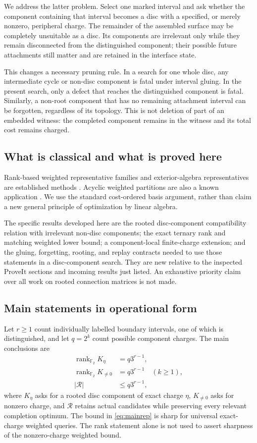\documentclass[11pt,letterpaper]{article}
\theoremstyle{definition}
\newcommand{\F}{\mathbb F}
\newcommand{\rank}{\operatorname{rank}}
\begin{document}
We address the latter problem. Select one marked interval and ask whether the component containing that interval becomes a disc with a specified, or merely nonzero, peripheral charge. The remainder of the assembled surface may be completely unsuitable as a disc. Its components are irrelevant only while they remain disconnected from the distinguished component; their possible future attachments still matter and are retained in the interface state.

This changes a necessary pruning rule. In a search for one whole disc, any intermediate cycle or non-disc component is fatal under interval gluing. In the present search, only a defect that reaches the distinguished component is fatal. Similarly, a non-root component that has no remaining attachment interval can be forgotten, regardless of its topology. This is not deletion of part of an embedded witness: the completed component remains in the witness and its total cost remains charged.

\subsection{What is classical and what is proved here}
Rank-based weighted representative families and exterior-algebra representatives are established methods \cite{bckn,flps}. Acyclic weighted partitions are also a known application \cite{bk}. We use the standard cost-ordered basis argument, rather than claim a new general principle of optimization by linear algebra.

The specific results developed here are the rooted disc-component compatibility relation with irrelevant non-disc components; the exact ternary rank and matching weighted lower bound; a component-local finite-charge extension; and the gluing, forgetting, rooting, and replay contracts needed to use those statements in a disc-component search. They are new relative to the inspected ProveIt sections and incoming results just listed. An exhaustive priority claim over all work on rooted connection matrices is not made.

\subsection{Main statements in operational form}
Let $r\geq1$ count individually labelled boundary intervals, one of which is distinguished, and let $q=2^k$ count possible component charges. The main conclusions are
\begin{align}
 \rank_{\F_2} K_\eta&=q3^{r-1},\label{eq:mainrank}\\
 \rank_{\F_2} K_{\ne0}&=q3^{r-1}\quad(k\geq1),\label{eq:mainranknz}\\
 |\mathcal R|&\leq q3^{r-1},\label{eq:mainrep}
\end{align}
where $K_\eta$ asks for a rooted disc component of exact charge $\eta$, $K_{\ne0}$ asks for nonzero charge, and $\mathcal R$ retains actual candidates while preserving every relevant completion optimum. The bound in \eqref{eq:mainrep} is sharp for universal exact-charge weighted queries. The rank statement alone is not used to assert sharpness of the nonzero-charge weighted bound.
\end{document}
